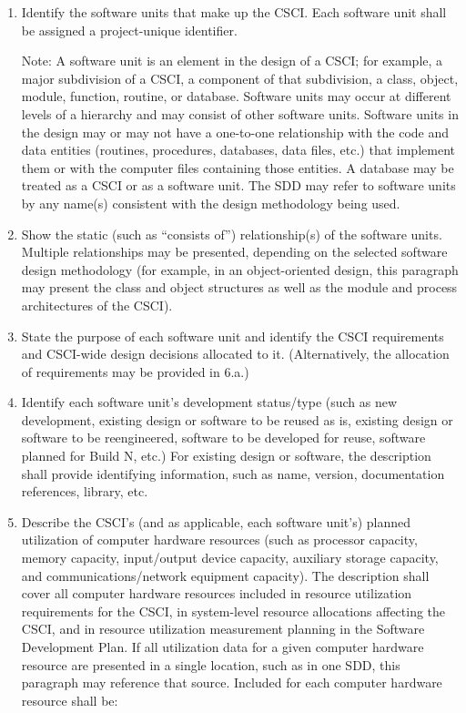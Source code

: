 \documentclass{fidata-report-template}
\begin{document}
\begin{enumerate}
\itemsep1pt\parskip0pt
\item
  Identify the software units that make up the CSCI. Each software unit
  shall be assigned a project-unique identifier.

  Note: A software
  unit is an element in the design of a CSCI; for example, a major
  subdivision of a CSCI, a component of that subdivision, a class,
  object, module, function, routine, or database. Software units may
  occur at different levels of a hierarchy and may consist of other
  software units. Software units in the design may or may not have a
  one-to-one relationship with the code and data entities (routines,
  procedures, databases, data files, etc.) that implement them or with
  the computer files containing those entities. A database may be
  treated as a CSCI or as a software unit. The SDD may refer to software
  units by any name(s) consistent with the design methodology being
  used.
\item
  Show the static (such as ``consists of'') relationship(s) of the
  software units. Multiple relationships may be presented, depending on
  the selected software design methodology (for example, in an
  object-oriented design, this paragraph may present the class and
  object structures as well as the module and process architectures of
  the CSCI).
\item
  State the purpose of each software unit and identify the CSCI
  requirements and CSCI-wide design decisions allocated to it.
  (Alternatively, the allocation of requirements may be provided in
  6.a.)
\item
  Identify each software unit's development status/type (such as new
  development, existing design or software to be reused as is, existing
  design or software to be reengineered, software to be developed for
  reuse, software planned for Build N, etc.) For existing design or
  software, the description shall provide identifying information, such
  as name, version, documentation references, library, etc.
\item
  Describe the CSCI's (and as applicable, each software unit's) planned
  utilization of computer hardware resources (such as processor
  capacity, memory capacity, input/output device capacity, auxiliary
  storage capacity, and communications/network equipment capacity). The
  description shall cover all computer hardware resources included in
  resource utilization requirements for the CSCI, in system-level
  resource allocations affecting the CSCI, and in resource utilization
  measurement planning in the Software Development Plan. If all
  utilization data for a given computer hardware resource are presented
  in a single location, such as in one SDD, this paragraph may reference
  that source. Included for each computer hardware resource shall be:


\end{enumerate}
\end{document}
